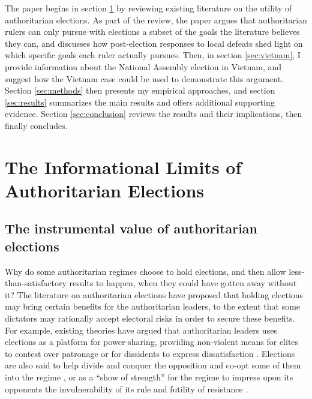 \documentclass[12pt]{article}
\newcommand{\1}{\mathbbm{1}}
\begin{document}
The paper begins in section \ref{sec:theory} by reviewing existing literature on the utility of authoritarian elections. As part of the review, the paper argues that authoritarian rulers can only pursue with elections a subset of the goals the literature believes they can, and discusses how post-election responses to local defeats shed light on which specific goals each ruler actually pursues. Then, in section \ref{sec:vietnam}, I provide information about the National Assembly election in Vietnam, and suggest how the Vietnam case could be used to demonstrate this argument. Section \ref{sec:methods} then presents my empirical approaches, and section \ref{sec:results} summarizes the main results and offers additional supporting evidence. Section \ref{sec:conclusion} reviews the results and their implications, then finally concludes.

\section{The Informational Limits of Authoritarian Elections}
\label{sec:theory}

\subsection{The instrumental value of authoritarian elections}
\label{sec:theory_lit_review}

Why do some authoritarian regimes choose to hold elections, and then allow less-than-satisfactory results to happen, when they could have gotten away without it? The literature on authoritarian elections have proposed that holding elections may bring certain benefits for the authoritarian leaders, to the extent that some dictators may rationally accept electoral risks in order to secure these benefits. For example, existing theories have argued that authoritarian leaders uses elections as a platform for power-sharing, providing non-violent means for elites to contest over patronage \citep{LustOkar2006} or for dissidents to express dissatisfaction \citep{AR2005}. Elections are also said to help divide and conquer the opposition and co-opt some of them into the regime \citep{LustOkar2005}, or as a ``show of strength'' for the regime to impress upon its opponents the invulnerability of its rule and futility of resistance \citep{Geddes2005}. 
\end{document}
